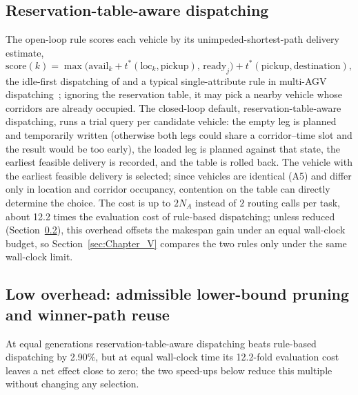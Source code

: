 \documentclass[preprint,review,12pt,authoryear,doubleblind]{elsarticle}
\newcommand{\CostMultBefore}{12.2}
\newcommand{\GainProbeSameGen}{2.90\%}
\begin{document}
\subsection{Reservation-table-aware dispatching}
\label{sec:dispatch}

The open-loop rule scores each vehicle by its unimpeded-shortest-path delivery estimate,
\begin{equation}
\label{eq:rule}
\mathrm{score}(k)=\max\bigl(\mathrm{avail}_k+t^{*}(\mathrm{loc}_k,\text{pickup}),\,
\mathrm{ready}_j\bigr)+t^{*}(\text{pickup},\text{destination}),
\end{equation}
the idle-first dispatching of \citet{li2026framework} and a typical single-attribute rule in multi-AGV dispatching~\citep{lu2022agv}; ignoring the reservation table, it may pick a nearby vehicle whose corridors are already occupied.
The closed-loop default, reservation-table-aware dispatching, runs a trial query per candidate vehicle: the empty leg is planned and temporarily written (otherwise both legs could share a corridor--time slot and the result would be too early), the loaded leg is planned against that state, the earliest feasible delivery is recorded, and the table is rolled back.
The vehicle with the earliest feasible delivery is selected; since vehicles are identical (A5) and differ only in location and corridor occupancy, contention on the table can directly determine the choice.
The cost is up to $2N_A$ instead of $2$ routing calls per task, about \CostMultBefore{} times the evaluation cost of rule-based dispatching; unless reduced (Section~\ref{sec:speedup}), this overhead offsets the makespan gain under an equal wall-clock budget, so Section~\ref{sec:Chapter_V} compares the two rules only under the same wall-clock limit.

\subsection{Low overhead: admissible lower-bound pruning and winner-path reuse}
\label{sec:speedup}

At equal generations reservation-table-aware dispatching beats rule-based dispatching by \GainProbeSameGen{}, but at equal wall-clock time its \CostMultBefore{}-fold evaluation cost leaves a net effect close to zero; the two speed-ups below reduce this multiple without changing any selection.
\end{document}
